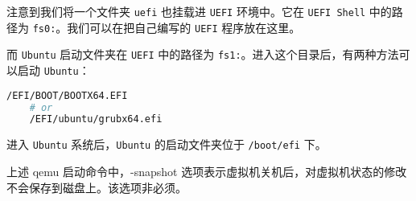 注意到我们将一个文件夹 \texttt{uefi} 也挂载进 \texttt{UEFI} 环境中。它在 \texttt{UEFI Shell} 中的路径为 \texttt{fs0:}。我们可以在把自己编写的 \texttt{UEFI} 程序放在这里。

而 \texttt{Ubuntu} 启动文件夹在 \texttt{UEFI} 中的路径为 \texttt{fs1:}。进入这个目录后，有两种方法可以启动 \texttt{Ubuntu}：

\begin{lstlisting}[language=bash]
    /EFI/BOOT/BOOTX64.EFI
    # or
    /EFI/ubuntu/grubx64.efi
\end{lstlisting}

进入 \texttt{Ubuntu} 系统后，\texttt{Ubuntu} 的启动文件夹位于 \texttt{/boot/efi} 下。

\begin{remark}
    上述 qemu 启动命令中，-snapshot 选项表示虚拟机关机后，对虚拟机状态的修改不会保存到磁盘上。该选项非必须。
\end{remark}
